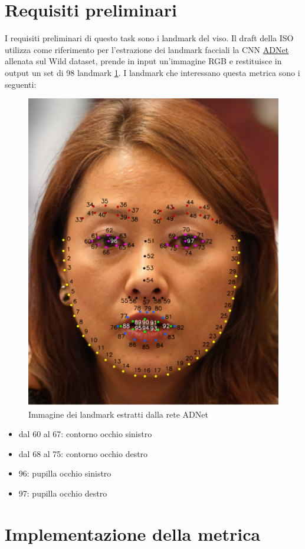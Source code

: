 \documentclass[12pt,a4paper,openright,twoside]{book}
\begin{document}
\section{Requisiti preliminari}
I requisiti preliminari di questo task sono i landmark del viso. Il draft della ISO utilizza come riferimento per l'estrazione dei landmark facciali la CNN \href{https://github.com/huangyangyu/ADNet}{ADNet} allenata sul Wild dataset, prende in input un'immagine RGB e restituisce in output un set di 98 landmark \cref{fig:landmark-face}. I landmark che interessano questa metrica sono i seguenti:
\begin{figure}
    \centering
    \includegraphics[width=.6\linewidth]{figures/landmark-face.png}
    \caption{Immagine dei landmark estratti dalla rete ADNet}
    \label{fig:landmark-face}
\end{figure}
\begin{itemize}
    \item dal 60 al 67: contorno occhio sinistro
    \item dal 68 al 75: contorno occhio destro
    \item 96: pupilla occhio sinistro
    \item 97: pupilla occhio destro
\end{itemize}

\section{Implementazione della metrica}
\end{document}
